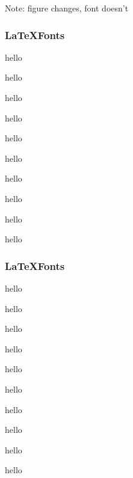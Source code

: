 \begin{frame}
\end{frame}

\begin{frame}
\end{frame}

\begin{frame}
  \begin{columns}
  \end{columns}
\end{frame}


\begin{frame}
\end{frame}

\begin{frame}
\end{frame}

\begin{frame}
\end{frame}


\begin{frame}
\end{frame}

\usebackgroundtemplate{}

\begin{frame}
Note: figure changes, font doesn't
\end{frame}



\usebackgroundtemplate{}
\begin{frame}\frametitle{\LaTeX Fonts}
\tiny hello

\scriptsize hello

\footnotesize hello

\small hello

\normalsize hello

\large hello

\Large hello

\LARGE hello

\huge hello

\Huge hello
\end{frame}





\begin{frame}\frametitle{\LaTeX Fonts}
\tiny hello

\scriptsize hello

\footnotesize hello

\small hello

\normalsize hello

\large hello

\Large hello

\LARGE hello

\huge hello

\Huge hello
\end{frame}

